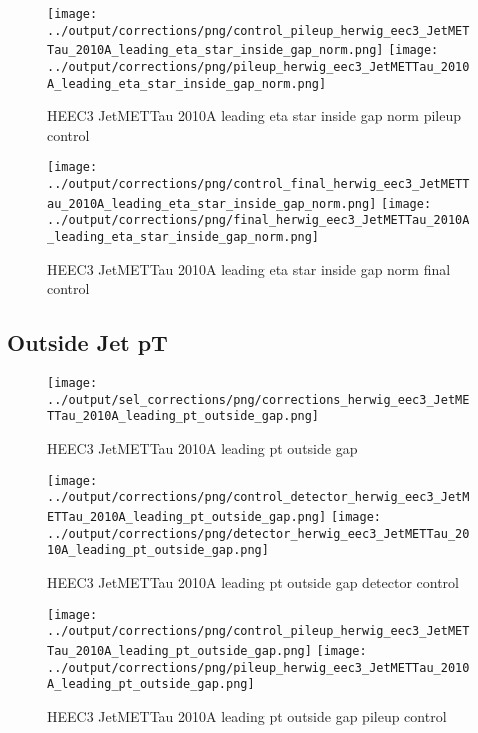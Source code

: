 \documentclass[11pt]{book}
\begin{document}
\begin{figure}[ht]
\centering
\texttt{[image: ../output/corrections/png/control\_pileup\_herwig\_eec3\_JetMETTau\_2010A\_leading\_eta\_star\_inside\_gap\_norm.png]}
\texttt{[image: ../output/corrections/png/pileup\_herwig\_eec3\_JetMETTau\_2010A\_leading\_eta\_star\_inside\_gap\_norm.png]}
\caption{HEEC3 JetMETTau 2010A leading eta star inside gap norm pileup control}
\label{fig:HEEC3_JetMETTau_2010A_leading_eta_star_inside_gap_norm_pileup_control}
\end{figure}


\begin{figure}[ht]
\centering
\texttt{[image: ../output/corrections/png/control\_final\_herwig\_eec3\_JetMETTau\_2010A\_leading\_eta\_star\_inside\_gap\_norm.png]}
\texttt{[image: ../output/corrections/png/final\_herwig\_eec3\_JetMETTau\_2010A\_leading\_eta\_star\_inside\_gap\_norm.png]}
\caption{HEEC3 JetMETTau 2010A leading eta star inside gap norm final control}
\label{fig:HEEC3_JetMETTau_2010A_leading_eta_star_inside_gap_norm_final_control}
\end{figure}

\clearpage
\subsection{Outside Jet pT}
\begin{figure}[ht]
\centering
\texttt{[image: ../output/sel\_corrections/png/corrections\_herwig\_eec3\_JetMETTau\_2010A\_leading\_pt\_outside\_gap.png]}
\caption{HEEC3 JetMETTau 2010A leading pt outside gap}
\label{fig:HEEC3_JetMETTau_2010A_leading_pt_outside_gap}
\end{figure}

\begin{figure}[ht]
\centering
\texttt{[image: ../output/corrections/png/control\_detector\_herwig\_eec3\_JetMETTau\_2010A\_leading\_pt\_outside\_gap.png]}
\texttt{[image: ../output/corrections/png/detector\_herwig\_eec3\_JetMETTau\_2010A\_leading\_pt\_outside\_gap.png]}
\caption{HEEC3 JetMETTau 2010A leading pt outside gap detector control}
\label{fig:HEEC3_JetMETTau_2010A_leading_pt_outside_gap_detector_control}
\end{figure}

\begin{figure}[ht]
\centering
\texttt{[image: ../output/corrections/png/control\_pileup\_herwig\_eec3\_JetMETTau\_2010A\_leading\_pt\_outside\_gap.png]}
\texttt{[image: ../output/corrections/png/pileup\_herwig\_eec3\_JetMETTau\_2010A\_leading\_pt\_outside\_gap.png]}
\caption{HEEC3 JetMETTau 2010A leading pt outside gap pileup control}
\label{fig:HEEC3_JetMETTau_2010A_leading_pt_outside_gap_pileup_control}
\end{figure}
\end{document}
